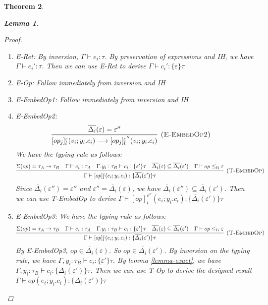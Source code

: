\documentclass{article}
\newtheorem{theorem}{Theorem}[section]
\newtheorem{lemma}[theorem]{Lemma}
\begin{document}
\begin{theorem}
\begin{lemma}
\begin{proof}
\begin{enumerate}
\item E-Ret: By inversion, $\Gamma \vdash e_i: \tau$. By preservation of expressions and IH, we have  $\Gamma \vdash e_i': \tau$. Then we can use E-Ret to derive $\Gamma  \vdash c_i' : \{\varepsilon\} \tau$
\item E-Op: Follow immediately from inversion and IH
\item E-EmbedOp1: Follow immediately from inversion and IH
\item E-EmbedOp2:  
$$\infer[\textsc{(E-EmbedOp2)}]
{[op_j]^\varepsilon_l(v_i; y_i.c_i) \longrightarrow [op_j]^{\varepsilon''}_l(v_i; y_i.c_i) }
{\overline{\Delta_i}(\varepsilon) = \varepsilon''} \quad $$
We have the typing rule as follows:
$$\infer[\textsc{(T-EmbedOp)}]
  {\Gamma\vdash [op]^\varepsilon_l(e_i; y_i.c_i) : \{\overline{\Delta_i}(\varepsilon')\}\tau }
  {\Sigma(op) = \tau_A \rightarrow \tau_B & \Gamma \vdash e_i : \tau_A & \Gamma. y_i:\tau_B\vdash c_i: \{\varepsilon'\}\tau & \overline{\Delta_i}(\varepsilon) \subseteq \overline{\Delta_i}(\varepsilon') & \Gamma \vdash op \leq_{li} \varepsilon}  $$
  Since $\overline{\Delta_i}(\varepsilon'') = \varepsilon''$ and $\varepsilon'' = \overline{\Delta_i}(\varepsilon)$, we have $\overline{\Delta_i}(\varepsilon'')  \subseteq \overline{\Delta_i}(\varepsilon')$. Then we can use T-EmbedOp to derive $\Gamma\vdash [op]^{\varepsilon''}_l(e_i; y_i.c_i) : \{\overline{\Delta_i}(\varepsilon')\}\tau $
\item E-EmbedOp3:
  We have the typing rule as follows:
$$\infer[\textsc{(T-EmbedOp)}]
  {\Gamma\vdash [op]^\varepsilon_l(e_i; y_i.c_i) : \{\overline{\Delta_i}(\varepsilon')\}\tau }
  {\Sigma(op) = \tau_A \rightarrow \tau_B & \Gamma \vdash e_i : \tau_A & \Gamma. y_i:\tau_B\vdash c_i: \{\varepsilon'\}\tau & \overline{\Delta_i}(\varepsilon) \subseteq \overline{\Delta_i}(\varepsilon') & \Gamma \vdash op \leq_{li} \varepsilon}  $$
  By E-EmbedOp3, $op \in \overline{\Delta_i}(\varepsilon)$. So $op \in \overline{\Delta_i}(\varepsilon')$. 
By inversion on the typing rule, we have $\Gamma, y_i:\tau_B\vdash c_i: \{\varepsilon'\}\tau$. By lemma \ref{lemma-exact}, we have $\Gamma, y_i:\tau_B\vdash c_i: \{\overline{\Delta_i}(\varepsilon')\}\tau$. Then we can use T-Op to derive the designed result $\Gamma \vdash op(e_i; y_i.c_i) : \{\overline{\Delta_i}(\varepsilon')\}\tau $


\end{enumerate}
\end{proof}
\end{lemma}
\end{theorem}
\end{document}
